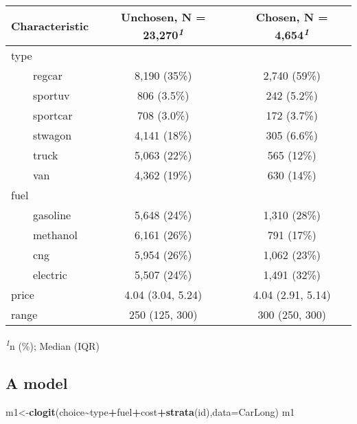 \documentclass[
  11pt,
]{article}
\newenvironment{Shaded}{\begin{snugshade}}{\end{snugshade}}
\newcommand{\AttributeTok}[1]{\textcolor[rgb]{0.13,0.29,0.53}{#1}}
\newcommand{\FunctionTok}[1]{\textcolor[rgb]{0.13,0.29,0.53}{\textbf{#1}}}
\newcommand{\NormalTok}[1]{#1}
\newcommand{\OtherTok}[1]{\textcolor[rgb]{0.56,0.35,0.01}{#1}}
\newcommand{\SpecialCharTok}[1]{\textcolor[rgb]{0.81,0.36,0.00}{\textbf{#1}}}
\begin{document}
\setlength{\LTpost}{0mm}
\begin{longtable}{lcc}
\toprule
\textbf{Characteristic} & \textbf{Unchosen}, N = 23,270\textsuperscript{\textit{1}} & \textbf{Chosen}, N = 4,654\textsuperscript{\textit{1}} \\ 
\midrule\addlinespace[2.5pt]
type &  &  \\ 
    regcar & 8,190 (35\%) & 2,740 (59\%) \\ 
    sportuv & 806 (3.5\%) & 242 (5.2\%) \\ 
    sportcar & 708 (3.0\%) & 172 (3.7\%) \\ 
    stwagon & 4,141 (18\%) & 305 (6.6\%) \\ 
    truck & 5,063 (22\%) & 565 (12\%) \\ 
    van & 4,362 (19\%) & 630 (14\%) \\ 
fuel &  &  \\ 
    gasoline & 5,648 (24\%) & 1,310 (28\%) \\ 
    methanol & 6,161 (26\%) & 791 (17\%) \\ 
    cng & 5,954 (26\%) & 1,062 (23\%) \\ 
    electric & 5,507 (24\%) & 1,491 (32\%) \\ 
price & 4.04 (3.04, 5.24) & 4.04 (2.91, 5.14) \\ 
range & 250 (125, 300) & 300 (250, 300) \\ 
\bottomrule
\end{longtable}
\begin{minipage}{\linewidth}
\textsuperscript{\textit{1}}n (\%); Median (IQR)\\
\end{minipage}

\normalsize

\hypertarget{a-model}{%
\subsection{A model}\label{a-model}}

\footnotesize

\begin{Shaded}
\begin{Highlighting}[]
\NormalTok{m1}\OtherTok{\textless{}{-}}\FunctionTok{clogit}\NormalTok{(choice}\SpecialCharTok{\textasciitilde{}}\NormalTok{type}\SpecialCharTok{+}\NormalTok{fuel}\SpecialCharTok{+}\NormalTok{cost}\SpecialCharTok{+}\FunctionTok{strata}\NormalTok{(id),}\AttributeTok{data=}\NormalTok{CarLong)}
\NormalTok{m1}
\end{Highlighting}
\end{Shaded}
\end{document}
